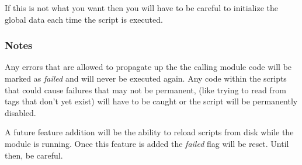 If this is not what you want then you will have to be careful to initialize
the global data each time the script is executed.

\subsubsection*{Notes}

Any errors that are allowed to propagate up the the calling module code
will be marked as \textit{failed} and will never be executed again.  Any
code within the scripts that could cause failures that may not be permanent,
(like trying to read from tags that don't yet exist) will have to be caught
or the script will be permanently disabled.

A future feature addition will be the ability to reload scripts from disk
while the module is running.  Once this feature is added the \textit{failed}
flag will be reset.  Until then, be careful.